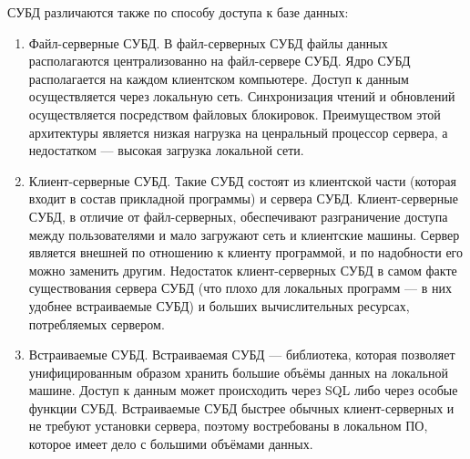 \documentclass[12pt,a4paper,oneside]{article} %
\begin{document}
СУБД различаются также по способу доступа к базе данных:
\begin{enumerate}
\item  Файл-серверные СУБД. В файл-серверных СУБД файлы данных \linebreak
располагаются централизованно на файл-сервере СУБД. Ядро СУБД \linebreak
располагается на каждом клиентском компьютере. Доступ к данным \linebreak
осуществляется через локальную сеть. Синхронизация чтений и \linebreak
обновлений осуществляется посредством файловых блокировок. \linebreak
Преимуществом этой архитектуры является низкая нагрузка на \linebreak
ценральный процессор сервера, а недостатком — высокая загрузка \linebreak
локальной сети.

\item Клиент-серверные СУБД. Такие СУБД состоят из клиентской части \linebreak
(которая входит в состав прикладной программы) и сервера СУБД. \linebreak
Клиент-серверные СУБД, в отличие от файл-серверных, обеспечивают \linebreak
разграничение доступа между пользователями и мало загружают сеть \linebreak
и клиентские машины. Сервер является внешней по отношению к \linebreak
клиенту программой, и по надобности его можно заменить другим. \linebreak
Недостаток клиент-серверных СУБД в самом факте существования \linebreak
сервера СУБД (что плохо для локальных программ — в них удобнее \linebreak
встраиваемые СУБД) и больших вычислительных ресурсах, потребляемых сервером.

\item Встраиваемые СУБД. Встраиваемая СУБД — библиотека, которая \linebreak
позволяет унифицированным образом хранить большие объёмы данных \linebreak
на локальной машине. Доступ к данным может происходить через SQL \linebreak
либо через особые функции СУБД. Встраиваемые СУБД быстрее \linebreak
обычных клиент-серверных и не требуют установки сервера, \linebreak
поэтому востребованы в локальном ПО, которое имеет дело с \linebreak
большими объёмами данных.
\end{enumerate}
\end{document}
